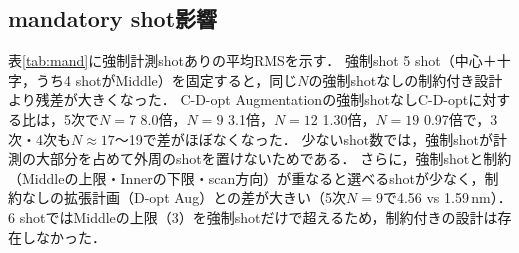 \documentclass[10.5pt,a4paper]{ltjsarticle}
\begin{document}
\subsection{mandatory shot影響}

表\ref{tab:mand}に強制計測shotありの平均RMSを示す．
強制shot 5 shot（中心＋十字，うち4 shotがMiddle）を固定すると，同じ$N$の強制shotなしの制約付き設計より残差が大きくなった．
C-D-opt Augmentationの強制shotなしC-D-optに対する比は，5次で$N=7$ 8.0倍，$N=9$ 3.1倍，$N=12$ 1.30倍，$N=19$ 0.97倍で，3次・4次も$N\approx17$〜19で差がほぼなくなった．
少ないshot数では，強制shotが計測の大部分を占めて外周のshotを置けないためである．
さらに，強制shotと制約（Middleの上限・Innerの下限・scan方向）が重なると選べるshotが少なく，制約なしの拡張計画（D-opt Aug）との差が大きい（5次$N=9$で4.56 vs 1.59\,nm）．
6 shotではMiddleの上限（3）を強制shotだけで超えるため，制約付きの設計は存在しなかった．
\end{document}
